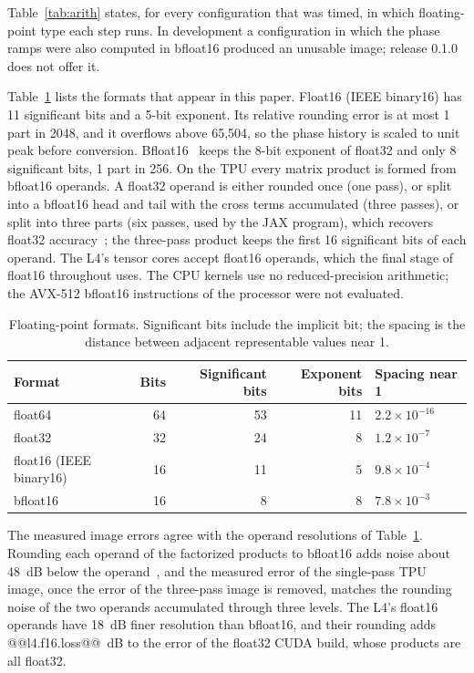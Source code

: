 \documentclass[11pt]{article}
\begin{document}
Table~\ref{tab:arith} states, for every configuration that was timed, in which floating-point type each step runs. In development a configuration in which the phase ramps were also computed in bfloat16 produced an unusable image; release 0.1.0 does not offer it.


Table~\ref{tab:formats} lists the formats that appear in this paper. Float16 (IEEE binary16) has 11 significant bits and a 5-bit exponent. Its relative rounding error is at most 1 part in 2048, and it overflows above 65,504, so the phase history is scaled to unit peak before conversion. Bfloat16~\cite{wang2019bfloat16} keeps the 8-bit exponent of float32 and only 8 significant bits, 1 part in 256. On the TPU every matrix product is formed from bfloat16 operands. A float32 operand is either rounded once (one pass), or split into a bfloat16 head and tail with the cross terms accumulated (three passes), or split into three parts (six passes, used by the JAX program), which recovers float32 accuracy~\cite{jax2018}; the three-pass product keeps the first 16 significant bits of each operand. The L4's tensor cores accept float16 operands, which the final stage of float16 throughout uses. The CPU kernels use no reduced-precision arithmetic; the AVX-512 bfloat16 instructions of the processor were not evaluated.

\begin{table}[tb]
\centering
\caption{Floating-point formats. Significant bits include the implicit bit; the spacing is the distance between adjacent representable values near 1.}
\label{tab:formats}
\begin{tabular}{lrrrl}
\toprule
Format & Bits & Significant bits & Exponent bits & Spacing near 1 \\
\midrule
float64 & 64 & 53 & 11 & $2.2 \times 10^{-16}$ \\
float32 & 32 & 24 & 8 & $1.2 \times 10^{-7}$ \\
float16 (IEEE binary16) & 16 & 11 & 5 & $9.8 \times 10^{-4}$ \\
bfloat16 & 16 & 8 & 8 & $7.8 \times 10^{-3}$ \\
\bottomrule
\end{tabular}
\end{table}

The measured image errors agree with the operand resolutions of Table~\ref{tab:formats}. Rounding each operand of the factorized products to bfloat16 adds noise about 48~dB below the operand~\cite{higham2002}, and the measured error of the single-pass TPU image, once the error of the three-pass image is removed, matches the rounding noise of the two operands accumulated through three levels. The L4's float16 operands have 18~dB finer resolution than bfloat16, and their rounding adds @@l4.f16.loss@@~dB to the error of the float32 CUDA build, whose products are all float32.
\end{document}
